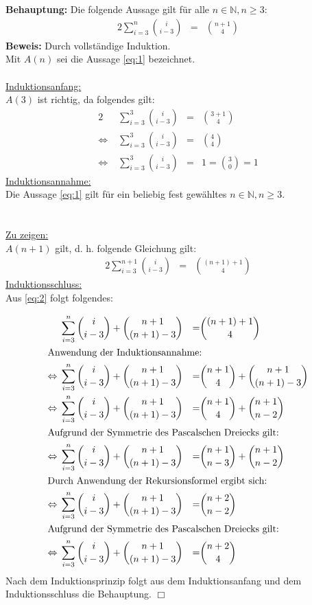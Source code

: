 \documentclass[10pt,a4paper,oneside,ngerman,numbers=noenddot]{scrartcl}
\begin{document}
\section{} %
\textbf{Behauptung:} Die folgende Aussage gilt für alle $n \in \mathbb{N},n \geq 3$:
\begin{alignat}{2}
\sum_{i=3}^{n} \binom{i}{i-3} &=& \binom{n+1}{4} \label{eq:1} 
\end{alignat}
\textbf{Beweis:} Durch vollständige Induktion.\\
Mit $A(n)$ sei die Aussage \eqref{eq:1} bezeichnet.\\\\
\underline{Induktionsanfang:} \\
$A(3)$ ist richtig, da folgendes gilt:
\begin{alignat}{2}
&\; \sum_{i=3}^{3} \binom{i}{i-3} &=& \binom{3+1}{4} \\
\Leftrightarrow &\; \sum_{i=3}^{3} \binom{i}{i-3} &=& \binom{4}{4} \\
\Leftrightarrow &\; \sum_{i=3}^{3} \binom{i}{i-3} &=& 1 = \binom{3}{0} = 1
\end{alignat}
\underline{Induktionsannahme:}\\
Die Aussage \eqref{eq:1} gilt für ein beliebig fest gewähltes $n \in \mathbb{N}, n \geq 3$.\\\\
\\
\underline{Zu zeigen:}\\
$A(n+1)$ gilt, d. h. folgende Gleichung gilt:
\begin{alignat}{2}
\sum_{i=3}^{n+1} \binom{i}{i-3} &=& \binom{(n+1)+1}{4} \label{eq:2} 
\end{alignat}
\underline{Induktionsschluss:}\\
Aus \eqref{eq:2} folgt folgendes:

\begin{alignat}{2}
&\; \sum_{i=3}^{n} \binom{i}{i-3} + \binom{n+1}{(n+1)-3} &=& \binom{(n+1)+1}{4} \\
\intertext{Anwendung der Induktionsannahme:}
\Leftrightarrow &\; \sum_{i=3}^{n} \binom{i}{i-3} + \binom{n+1}{(n+1)-3} &=& \binom{n+1}{4} + \binom{n+1}{(n+1)-3} \\
\Leftrightarrow &\; \sum_{i=3}^{n} \binom{i}{i-3} + \binom{n+1}{(n+1)-3} &=& \binom{n+1}{4} + \binom{n+1}{n-2} \\
\intertext{Aufgrund der Symmetrie des Pascalschen Dreiecks gilt:}
\Leftrightarrow &\; \sum_{i=3}^{n} \binom{i}{i-3} + \binom{n+1}{(n+1)-3} &=& \binom{n+1}{n-3} + \binom{n+1}{n-2} \\
\intertext{Durch Anwendung der Rekursionsformel ergibt sich:}
\Leftrightarrow &\; \sum_{i=3}^{n} \binom{i}{i-3} + \binom{n+1}{(n+1)-3} &=& \binom{n+2}{n-2} \\
\intertext{Aufgrund der Symmetrie des Pascalschen Dreiecks gilt:}
\Leftrightarrow &\; \sum_{i=3}^{n} \binom{i}{i-3} + \binom{n+1}{(n+1)-3} &=& \binom{n+2}{4}
\end{alignat}
Nach dem Induktionsprinzip folgt aus dem Induktionsanfang und dem Induktionsschluss die Behauptung. \hfill $\Box$
\end{document}
